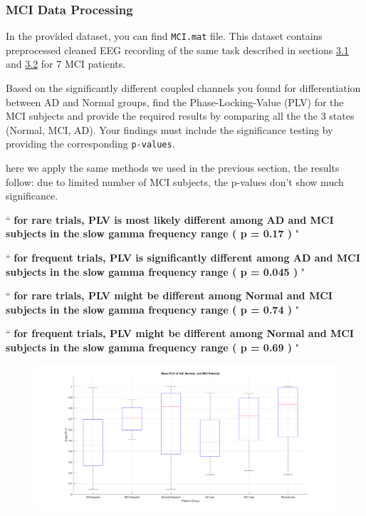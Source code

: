 \documentclass[12pt]{article}
\begin{document}
\subsubsection{MCI Data Processing}
In the provided dataset, you can find \texttt{MCI.mat} file. This dataset contains preprocessed cleaned EEG recording of the same task described in sections \hyperref[sec:sec3.1]{3.1} and \hyperref[sec:sec3.2]{3.2} for 7 MCI patients. \par
Based on the significantly different coupled channels you found for differentiation between AD and Normal groups, find the Phase-Locking-Value (PLV) for the MCI subjects and provide the required results by comparing all the the 3 states (Normal, MCI, AD). Your findings must include the significance testing by providing the corresponding \texttt{p-values}.

\begin{qsolve}[]
	here we apply the same methods we used in the previous section, the results follow:
	due to limited number of MCI subjects, the p-values don't show much significance.

	\begin{center}
		``\textbf{
			for rare trials, PLV is most likely different among AD and MCI subjects in the slow gamma frequency range ( p = 0.17 )
		}"

		``\textbf{
			for frequent trials, PLV is significantly different among AD and MCI subjects in the slow gamma frequency range ( p = 0.045 )
		}"

		``\textbf{
			for rare trials, PLV might be different among Normal and MCI subjects in the slow gamma frequency range ( p = 0.74 )
		}"

		``\textbf{
			for frequent trials, PLV might be    different among Normal and MCI subjects in the slow gamma frequency range ( p = 0.69 )
		}"
	\end{center}
\end{qsolve}

\begin{figure}[h]
	\centering
	\includegraphics*[width=\linewidth]{../computation/MCI/results/boxplot_MCI.png}
\end{figure}
\end{document}
